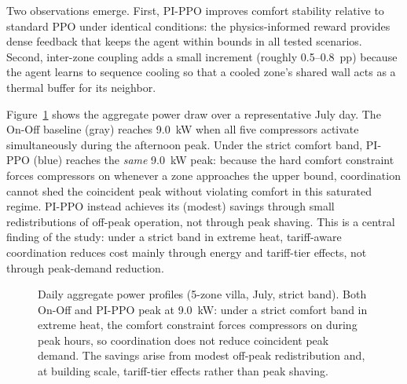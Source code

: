 \documentclass[12pt,a4paper]{article}
\begin{document}
Two observations emerge. First, PI-PPO improves comfort stability relative to standard PPO under identical conditions: the physics-informed reward provides dense feedback that keeps the agent within bounds in all tested scenarios. Second, inter-zone coupling adds a small increment (roughly 0.5--0.8~pp) because the agent learns to sequence cooling so that a cooled zone's shared wall acts as a thermal buffer for its neighbor.

Figure~\ref{fig:power} shows the aggregate power draw over a representative July day. The On-Off baseline (gray) reaches 9.0~kW when all five compressors activate simultaneously during the afternoon peak. Under the strict comfort band, PI-PPO (blue) reaches the \emph{same} 9.0~kW peak: because the hard comfort constraint forces compressors on whenever a zone approaches the upper bound, coordination cannot shed the coincident peak without violating comfort in this saturated regime. PI-PPO instead achieves its (modest) savings through small redistributions of off-peak operation, not through peak shaving. This is a central finding of the study: under a strict band in extreme heat, tariff-aware coordination reduces cost mainly through energy and tariff-tier effects, not through peak-demand reduction. 

\begin{figure}[H]
\centering
{}
\caption{Daily aggregate power profiles (5-zone villa, July, strict band). Both On-Off and PI-PPO peak at 9.0~kW: under a strict comfort band in extreme heat, the comfort constraint forces compressors on during peak hours, so coordination does not reduce coincident peak demand. The savings arise from modest off-peak redistribution and, at building scale, tariff-tier effects rather than peak shaving.}
\label{fig:power}
\end{figure}
\end{document}

